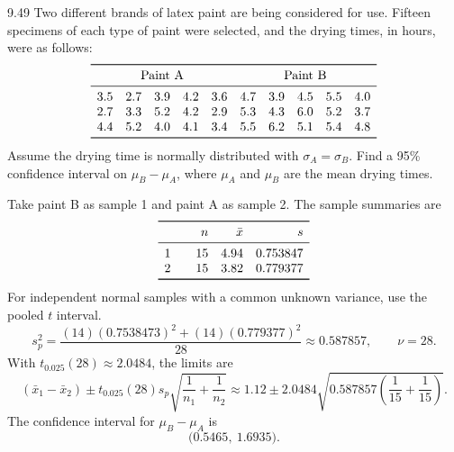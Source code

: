 \documentclass[11pt,oneside]{article}
\begin{document}
\begin{exercise}{9.49}
Two different brands of latex paint are being considered for use. Fifteen specimens of each type of paint were selected, and the drying times, in hours, were as follows:
\[
\begin{array}{cccccccccc}\toprule
\multicolumn{5}{c}{\text{Paint A}} & \multicolumn{5}{c}{\text{Paint B}}\\\midrule
3.5 & 2.7 & 3.9 & 4.2 & 3.6 & 4.7 & 3.9 & 4.5 & 5.5 & 4.0\\
2.7 & 3.3 & 5.2 & 4.2 & 2.9 & 5.3 & 4.3 & 6.0 & 5.2 & 3.7\\
4.4 & 5.2 & 4.0 & 4.1 & 3.4 & 5.5 & 6.2 & 5.1 & 5.4 & 4.8\\
\bottomrule\end{array}
\]
Assume the drying time is normally distributed with $\sigma_A=\sigma_B$. Find a 95\% confidence interval on $\mu_B-\mu_A$, where $\mu_A$ and $\mu_B$ are the mean drying times.
\end{exercise}
\begin{solution}
Take paint B as sample 1 and paint A as sample 2. The sample summaries are
\[
\begin{array}{c@{\qquad}rrr}\toprule &n&\bar x&s\\\midrule 1&15&4.94&0.753847\\2&15&3.82&0.779377\\\bottomrule\end{array}
\]
For independent normal samples with a common unknown variance, use the pooled $t$ interval.
\[
s_p^2=\frac{(14)(0.7538473)^2+(14)(0.779377)^2}{28}\approx0.587857,\qquad \nu=28.
\]
 With $t_{0.025}(28)\approx2.0484$, the limits are
\[
(\bar x_1-\bar x_2)\pm t_{0.025}(28)s_p\sqrt{\frac1{n_1}+\frac1{n_2}}\approx 1.12\pm 2.0484\sqrt{0.587857\left(\frac1{15}+\frac1{15}\right)}.
\]
The confidence interval for $\mu_B-\mu_A$ is 
\[
\boxed{\bigl(0.5465,\ 1.6935\bigr)}.
\]
\end{solution}
\end{document}
